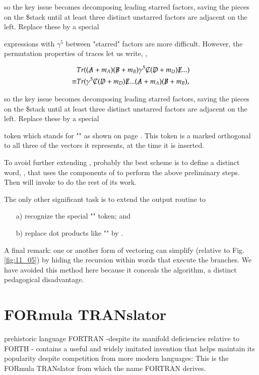 so the key issue becomes decomposing leading starred factors, saving the pieces on the \$stack until at least three distinct unstarred factors are adjacent on the left. Replace these by a special 

expressions with $\gamma^{5}$ between "starred" factors are more difficult. However, the permutation properties of traces let us write, \eg,

\begin{align}
& Tr( (\tr{A} + m_{A})(\tr{B} + m_{B})\gamma^{5} \tr{C}(\tr{D} + m_{D})\tr{E} ... ) \\
\equiv & Tr(\gamma^{5}\tr{C}(\tr{D} + m_{D})\tr{E} ... (\tr{A} + m_{A})(\tr{B} + m_{B}) ,
\end{align}

so the key issue becomes decomposing leading starred factors, saving the pieces on the \$stack until at least three distinct unstarred factors are adjacent on the left. Replace these by a special 

token which stands for "\bc{^}" as shown on page \pageref{page:11_276}. This token is a marked orthogonal to all three of the vectors it represents, at the time it is inserted.

To avoid further extending , probably the best scheme is to define a distinct word, , that uses the components of  to perform the above preliminary steps. Then  will invoke  to do the rest of its work.

The only other significant task is to extend the output routine to

\begin{enumerate}
\item[a)] recognize the special "\bc{^}" token; and
\item[b)] replace dot products like "" by \bc{[a,b,c,d]}.
\end{enumerate}


\leftbar[1\linewidth]
A final remark: one or another form of vectoring can simplify  (relative to Fig. \ref{fig:11_05}) by hiding the recursion within words that execute the branches. We have avoided this method here because it conceals the algorithm, a distinct pedagogical disadvantage.
\endleftbar

\section{FORmula TRANslator}
 prehistoric language FORTRAN -despite its manifold deficiencies relative to FORTH - contains a useful and widely imitated invention that helps maintain its popularity despite competition from more modern languages: This is the FORmula TRANslator from which the name FORTRAN derives.

